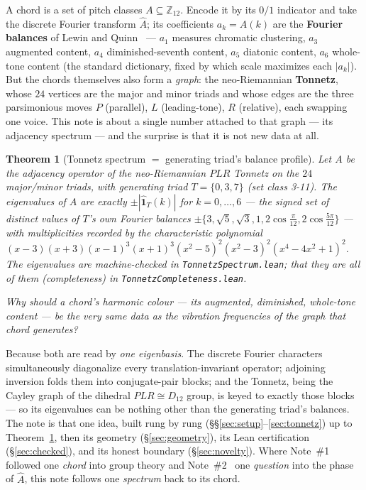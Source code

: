 \documentclass[11pt]{article}
\newtheorem{theorem}{Theorem}
\newcommand{\lean}[1]{\texttt{#1}}
\newcommand{\Ztwelve}{\mathbb{Z}_{12}}
\newcommand{\Ahat}{\hat{A}}
\newcommand{\question}[1]{\smallskip\noindent\textit{#1}\smallskip}
\begin{document}
A chord is a set of pitch classes $A\subseteq\Ztwelve$. Encode it by its $0/1$ indicator and take the
discrete Fourier transform $\Ahat$; its coefficients $a_k=\Ahat(k)$ are the \textbf{Fourier balances} of
Lewin and Quinn~\cite{Quinn} --- $a_1$ measures chromatic clustering, $a_3$ augmented content, $a_4$
diminished-seventh content, $a_5$ diatonic content, $a_6$ whole-tone content (the standard dictionary, fixed
by which scale maximizes each $|a_k|$). But the chords themselves also form a \emph{graph}: the
neo-Riemannian \textbf{Tonnetz}, whose $24$ vertices are the major and minor triads and whose edges are the
three parsimonious moves $P$ (parallel), $L$ (leading-tone), $R$ (relative), each swapping one voice. This
note is about a single number attached to that graph --- its adjacency spectrum --- and the surprise is that
it is not new data at all.

\begin{theorem}[Tonnetz spectrum $=$ generating triad's balance profile]\label{thm:main}
Let $A$ be the adjacency operator of the neo-Riemannian $PLR$ Tonnetz on the $24$ major/minor triads, with
generating triad $T=\{0,3,7\}$ (set class 3-11). The eigenvalues of $A$ are exactly
$\pm|\hat{\mathbf 1}_T(k)|$ for $k=0,\dots,6$ --- the signed set of distinct values of $T$'s own Fourier balances
$\pm\{3,\sqrt5,\sqrt3,1,2\cos\tfrac{\pi}{12},2\cos\tfrac{5\pi}{12}\}$ --- with multiplicities recorded by the
characteristic polynomial $(x-3)(x+3)(x-1)^3(x+1)^3(x^2-5)^2(x^2-3)^2(x^4-4x^2+1)^2$. The eigenvalues are
machine-checked in \lean{TonnetzSpectrum.lean}; that they are \emph{all} of them (completeness) in
\lean{TonnetzCompleteness.lean}.
\end{theorem}

\question{Why should a chord's harmonic colour --- its augmented, diminished, whole-tone content --- be the
very same data as the vibration frequencies of the graph that chord generates?}

\noindent Because both are read by \emph{one eigenbasis}. The discrete Fourier characters simultaneously
diagonalize every translation-invariant operator; adjoining inversion folds them into conjugate-pair blocks;
and the Tonnetz, being the Cayley graph of the dihedral $PLR\cong D_{12}$ group, is keyed to exactly those
blocks --- so its eigenvalues can be nothing other than the generating triad's balances. The note is that
one idea, built rung by rung (\S\S\ref{sec:setup}--\ref{sec:tonnetz}) up to Theorem~\ref{thm:main}, then its
geometry (\S\ref{sec:geometry}), its Lean certification (\S\ref{sec:checked}), and its honest boundary
(\S\ref{sec:novelty}). Where Note~\#1~\cite{Note1} followed one \emph{chord} into group theory and
Note~\#2~\cite{Note2} one \emph{question} into the phase of $\Ahat$, this note follows one \emph{spectrum}
back to its chord.
\end{document}
